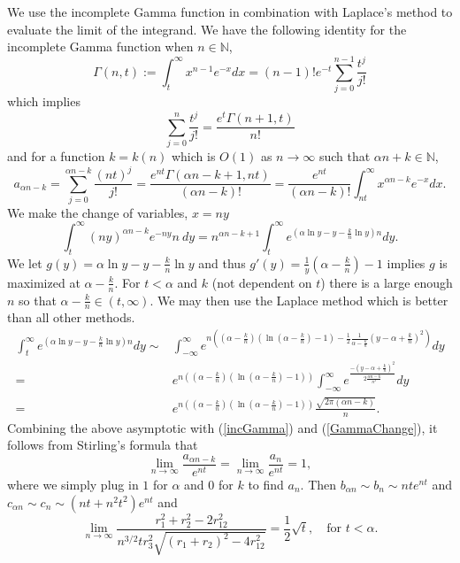 \documentclass[12pt]{amsart}
\theoremstyle{remark}
\begin{document}
We use the incomplete Gamma function in combination with Laplace's method to evaluate the limit of the integrand.  We have the following identity for the incomplete Gamma function when $n\in\mathbb{N}$,
\[\Gamma(n,t):=\int_t^\infty x^{n-1}e^{-x}dx=(n-1)!e^{-t}\sum_{j=0}^{n-1}\frac{t^j}{j!}\]
which implies
\[\sum_{j=0}^n\frac{t^j}{j!}=\frac{e^t\Gamma(n+1,t)}{n!}\]
and for a function $k=k(n)$ which is $O(1)$ as $n\rightarrow \infty$ such that $\alpha n +k\in\mathbb{N}$,
\begin{equation}
	\label{incGamma}
	a_{\alpha n-k}=\sum_{j=0}^{\alpha n-k}\frac{(nt)^j}{j!}
	=\frac{e^{nt}\Gamma(\alpha n-k+1,nt)}{(\alpha n-k)!}
	=\frac{e^{nt}}{(\alpha n-k)!}\int_{nt}^\infty x^{\alpha n-k}e^{-x}dx.
\end{equation}
We make the change of variables, $x=ny$
\begin{equation}
	\label{GammaChange}
	\int_t^\infty(ny)^{\alpha n-k}e^{-ny}n\ dy
	=n^{\alpha n-k+1}\int_t^\infty e^{(\alpha \ln y-y-\frac{k}{n}\ln y)n}dy.
\end{equation}
We let $g(y)=\alpha \ln y-y-\frac{k}{n}\ln y$ and thus $g'(y)=\frac{1}{y}\left(\alpha-\frac{k}{n}\right)-1$ implies $g$ is maximized at $\alpha-\frac{k}{n}$.  For $t<\alpha$ and $k$ (not dependent on $t$) there is a large enough $n$ so that $\alpha-\frac{k}{n}\in(t,\infty)$.  We may then use the Laplace method which is better than all other methods.
\begin{align*}
	\int_t^\infty e^{(\alpha\ln y-y-\frac{k}{n}\ln y)n}dy\sim
		&\int_{-\infty}^\infty e^{n\left(\left(\alpha-\frac{k}{n}\right)
		\left(\ln\left(\alpha-\frac{k}{n}\right)-1\right)
		-\frac{1}{2}\frac{1}{\alpha-\frac{k}{n}}
		\left(y-\alpha+\frac{k}{n}\right)^2\right)}dy
	\\=&e^{n\left(\left(\alpha-\frac{k}{n}\right)
		\left(\ln\left(\alpha-\frac{k}{n}\right)-1\right)\right)}
		\int_{-\infty}^\infty e^{\frac{-\left(y-\alpha+\frac{k}{n}\right)^2}
		{2\frac{\alpha n-k}{n^2}}}dy
	\\=&e^{n\left(\left(\alpha-\frac{k}{n}\right)
		\left(\ln\left(\alpha-\frac{k}{n}\right)-1\right)\right)}
		\frac{\sqrt{2\pi(\alpha n-k)}}{n}.
\end{align*}
Combining the above asymptotic with (\ref{incGamma}) and (\ref{GammaChange}), it follows from Stirling's formula that
\[\lim_{n\rightarrow\infty}\frac{a_{\alpha n-k}}{e^{nt}}=\lim_{n\rightarrow\infty}\frac{a_{n}}{e^{nt}}=1,\]
where we simply plug in $1$ for $\alpha$ and $0$ for $k$ to find $a_n$.  Then $b_{\alpha n}\sim b_n\sim nte^{nt}$ and $c_{\alpha n}\sim c_n\sim(nt+n^2t^2)e^{nt}$ and
\[\lim_{n\rightarrow\infty}\frac{r_1^2+r_2^2-2r_{12}^2}{n^{3/2}t r_3^2\sqrt{(r_1+r_2)^2-4r_{12}^2}}=\frac{1}{2}\sqrt{t},\quad\text{for $t<\alpha$}.\]
\end{document}
